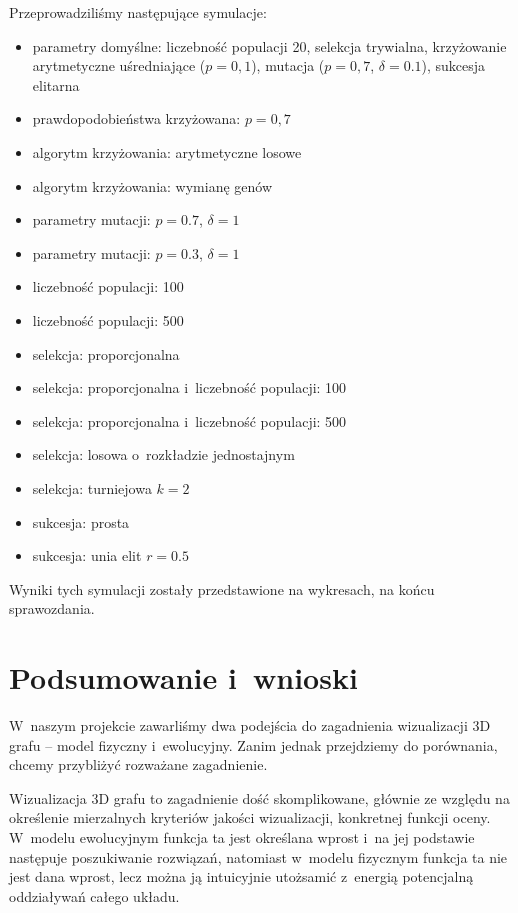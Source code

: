 \documentclass[a4paper,onecolumn,oneside,12pt]{mwart}
\begin{document}
Przeprowadziliśmy następujące symulacje:

\begin{itemize}
	\item parametry domyślne: liczebność populacji 20, selekcja trywialna,
		krzyżowanie arytmetyczne uśredniające ($p=0,1$), mutacja ($p=0,7$,
		$\delta=0.1$), sukcesja elitarna
	\item prawdopodobieństwa krzyżowana: $p=0,7$
	\item algorytm krzyżowania: arytmetyczne losowe
	\item algorytm krzyżowania: wymianę genów
	\item parametry mutacji: $p=0.7$, $\delta=1$
	\item parametry mutacji: $p=0.3$, $\delta=1$
	\item liczebność populacji: 100
	\item liczebność populacji: 500
	\item selekcja: proporcjonalna
	\item selekcja: proporcjonalna i~liczebność populacji: 100
	\item selekcja: proporcjonalna i~liczebność populacji: 500
	\item selekcja: losowa o~rozkładzie jednostajnym
	\item selekcja: turniejowa $k=2$
	\item sukcesja: prosta
	\item sukcesja: unia elit $r=0.5$
\end{itemize}

Wyniki tych symulacji zostały przedstawione na wykresach, na końcu
sprawozdania.

\section{Podsumowanie i~wnioski}

W~naszym projekcie zawarliśmy dwa podejścia do zagadnienia wizualizacji 3D
grafu -- model fizyczny i~ewolucyjny. Zanim jednak przejdziemy do
porównania, chcemy przybliżyć rozważane zagadnienie.

Wizualizacja 3D grafu to zagadnienie dość skomplikowane, głównie ze względu
na określenie mierzalnych kryteriów jakości wizualizacji, konkretnej
funkcji oceny. W~modelu ewolucyjnym funkcja ta jest określana wprost i~na
jej podstawie następuje poszukiwanie rozwiązań, natomiast w~modelu
fizycznym funkcja ta nie jest dana wprost, lecz można ją intuicyjnie
utożsamić z~energią potencjalną oddziaływań całego układu.
\end{document}
